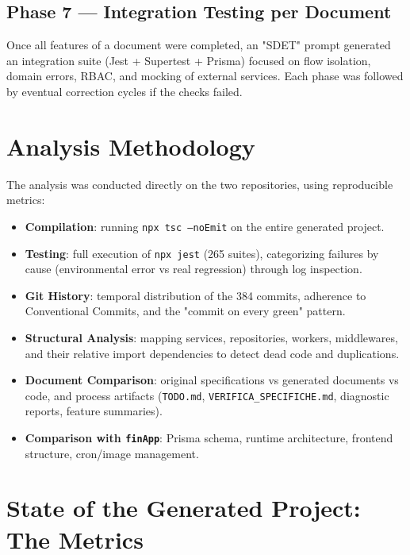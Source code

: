 \documentclass[11pt,a4paper]{article}
\newcommand{\file}[1]{\texttt{\small #1}}
\begin{document}
	\subsection{Phase 7 --- Integration Testing per Document}
	Once all features of a document were completed, an "SDET" prompt generated an integration suite (Jest + Supertest + Prisma) focused on flow isolation, domain errors, RBAC, and mocking of external services. Each phase was followed by eventual correction cycles if the checks failed.
	
	\section{Analysis Methodology}
	
	The analysis was conducted directly on the two repositories, using reproducible metrics:
	
	\begin{itemize}[leftmargin=1.5em]
		\item \textbf{Compilation}: running \file{npx tsc --noEmit} on the entire generated project.
		\item \textbf{Testing}: full execution of \file{npx jest} (265 suites), categorizing failures by cause (environmental error vs real regression) through log inspection.
		\item \textbf{Git History}: temporal distribution of the 384 commits, adherence to Conventional Commits, and the "commit on every green" pattern.
		\item \textbf{Structural Analysis}: mapping services, repositories, workers, middlewares, and their relative import dependencies to detect dead code and duplications.
		\item \textbf{Document Comparison}: original specifications vs generated documents vs code, and process artifacts (\file{TODO.md}, \file{VERIFICA\_SPECIFICHE.md}, diagnostic reports, feature summaries).
		\item \textbf{Comparison with \file{finApp}}: Prisma schema, runtime architecture, frontend structure, cron/image management.
	\end{itemize}
	
	\section{State of the Generated Project: The Metrics}
	
\end{document}
